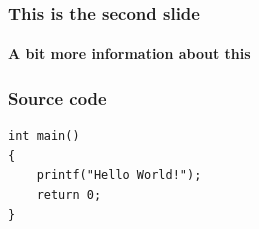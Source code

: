\documentclass{beamer}
\begin{document}
  \begin{frame}
    \frametitle{This is the second slide}
    \framesubtitle{A bit more information about this}
  \end{frame}
  \begin{frame}[fragile]

\frametitle{Source code}
 
\begin{lstlisting}[caption=First C example]
int main()
{
    printf("Hello World!");
    return 0;
}
\end{lstlisting}
\end{frame}
\end{document}
